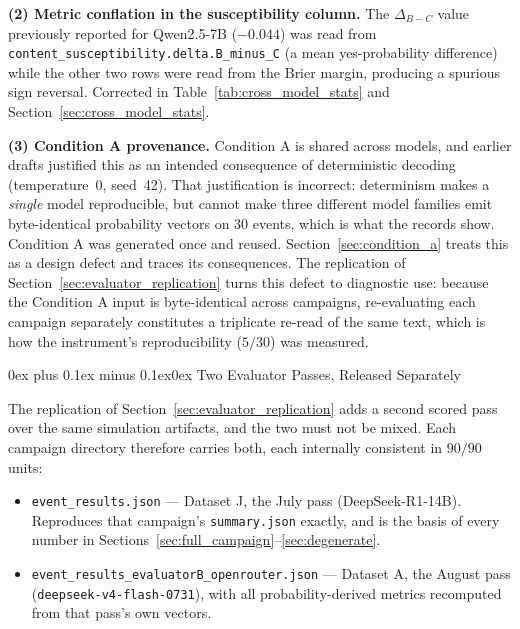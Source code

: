 \documentclass[11pt,journal,onecolumn]{IEEEtran}
\makeatletter
\renewcommand\subsubsection{\@startsection{subsubsection}{3}{\parindent}%
  {0ex plus 0.1ex minus 0.1ex}{0ex}%
  {\normalfont\normalsize\bfseries\itshape}}
\makeatother
\begin{document}
\textbf{(2) Metric conflation in the susceptibility column.} The $\Delta_{B-C}$ value previously reported for Qwen2.5-7B ($-0.044$) was read from \texttt{content\_susceptibility.delta.B\_minus\_C} (a mean yes-probability difference) while the other two rows were read from the Brier margin, producing a spurious sign reversal. Corrected in Table~\ref{tab:cross_model_stats} and Section~\ref{sec:cross_model_stats}.

\textbf{(3) Condition A provenance.} Condition A is shared across models, and earlier drafts justified this as an intended consequence of deterministic decoding (temperature~0, seed~42). That justification is incorrect: determinism makes a \emph{single} model reproducible, but cannot make three different model families emit byte-identical probability vectors on 30 events, which is what the records show. Condition A was generated once and reused. Section~\ref{sec:condition_a} treats this as a design defect and traces its consequences. The replication of Section~\ref{sec:evaluator_replication} turns this defect to diagnostic use: because the Condition A input is byte-identical across campaigns, re-evaluating each campaign separately constitutes a triplicate re-read of the same text, which is how the instrument's reproducibility ($5/30$) was measured.

\subsubsection{Two Evaluator Passes, Released Separately}
\label{sec:data_audit_two_passes}

The replication of Section~\ref{sec:evaluator_replication} adds a second scored pass over the same simulation artifacts, and the two must not be mixed. Each campaign directory therefore carries both, each internally consistent in $90/90$ units:

\begin{itemize}
    \item \texttt{event\_results.json} --- Dataset J, the July pass (DeepSeek-R1-14B). Reproduces that campaign's \texttt{summary.json} exactly, and is the basis of every number in Sections~\ref{sec:full_campaign}--\ref{sec:degenerate}.
    \item \texttt{event\_results\_evaluatorB\_openrouter.json} --- Dataset A, the August pass (\texttt{deepseek-v4-flash-0731}), with all probability-derived metrics recomputed from that pass's own vectors.
\end{itemize}
\end{document}
